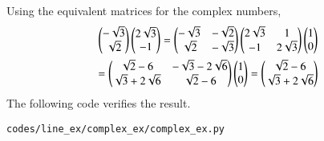 Using the equivalent matrices for the complex numbers, 
\begin{multline}
\begin{pmatrix}-\sqrt{3}\\ \sqrt{2}\end{pmatrix} \begin{pmatrix}2\sqrt{3} \\ -1\end{pmatrix} = \begin{pmatrix}-\sqrt{3} & -\sqrt{2} \\ \sqrt{2} & -\sqrt{3}\end{pmatrix}\begin{pmatrix}2\sqrt{3} & 1 \\ -1 & 2\sqrt{3}\end{pmatrix}\begin{pmatrix}1\\0\end{pmatrix}\\
= \begin{pmatrix}\sqrt{2} - 6 & -\sqrt{3} - 2\sqrt{6} \\ \sqrt{3} + 2\sqrt{6} & \sqrt{2} - 6\end{pmatrix}\begin{pmatrix}1\\0\end{pmatrix}\label{eq:complex_complex_ex}
=\begin{pmatrix}\sqrt{2} - 6 \\ \sqrt{3} + 2\sqrt{6}\end{pmatrix}
\end{multline}
%
The following code  verifies the result.
\begin{lstlisting}
codes/line_ex/complex_ex/complex_ex.py
\end{lstlisting}


